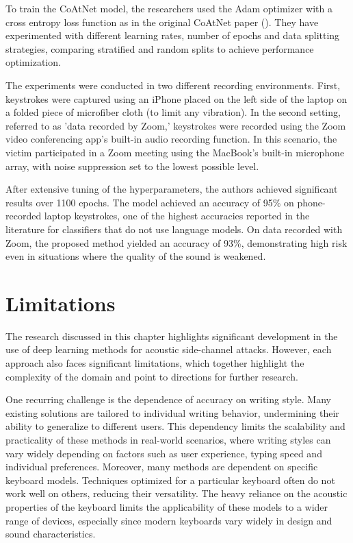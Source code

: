 \documentclass[a4paper,11pt,twoside]{report}
\theoremstyle{definition}
\begin{document}
To train the CoAtNet model, the researchers used the Adam optimizer with a cross entropy loss function as in the original CoAtNet paper (\textit{\cite{CoAtNet}}). They have experimented with different learning rates, number of epochs and data splitting strategies, comparing stratified and random splits to achieve performance optimization.

The experiments were conducted in two different recording environments. First, keystrokes were captured using an iPhone placed on the left side of the laptop on a folded piece of microfiber cloth (to limit any vibration). In the second setting, referred to as 'data recorded by Zoom,' keystrokes were recorded using the Zoom video conferencing app's built-in audio recording function. In this scenario, the victim participated in a Zoom meeting using the MacBook's built-in microphone array, with noise suppression set to the lowest possible level.

After extensive tuning of the hyperparameters, the authors achieved significant results over 1100 epochs. The model achieved an accuracy of 95\% on phone-recorded laptop keystrokes, one of the highest accuracies reported in the literature for classifiers that do not use language models. On data recorded with Zoom, the proposed method yielded an accuracy of 93\%, demonstrating high risk even in situations where the quality of the sound is weakened.

\section{Limitations}

The research discussed in this chapter highlights significant development in the use of deep learning methods for acoustic side-channel attacks. However, each approach also faces significant limitations, which together highlight the complexity of the domain and point to directions for further research.

One recurring challenge is the dependence of accuracy on writing style. Many existing solutions are tailored to individual writing behavior, undermining their ability to generalize to different users. This dependency limits the scalability and practicality of these methods in real-world scenarios, where writing styles can vary widely depending on factors such as user experience, typing speed and individual preferences. Moreover, many methods are dependent on specific keyboard models. Techniques optimized for a particular keyboard often do not work well on others, reducing their versatility. The heavy reliance on the acoustic properties of the keyboard limits the applicability of these models to a wider range of devices, especially since modern keyboards vary widely in design and sound characteristics.
\end{document}
